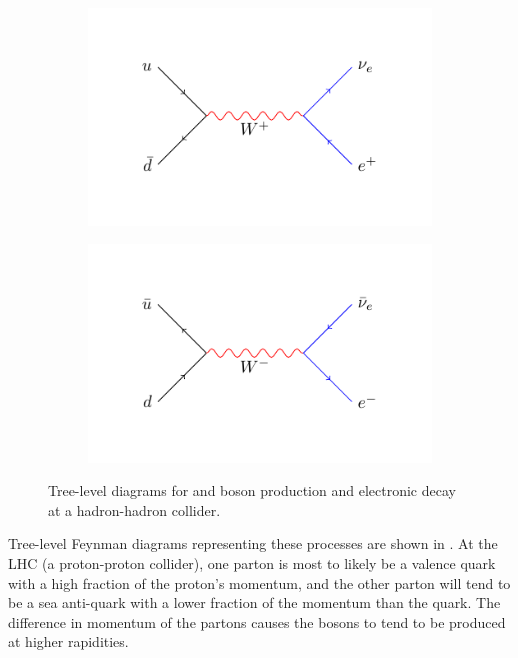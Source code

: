 \begin{figure}[htbp]
  \centering
  \begin{subfigure}{0.45\textwidth}
    \centering
    \includegraphics[width=\textwidth]{w_process_wp}
    \caption{\HepProcess{\Pup + \APdown \to \PWp \to \Pleptonplus \Pnulepton}}
    \label{fig:w_process_wp}
  \end{subfigure}
  \begin{subfigure}{0.45\textwidth}
    \centering
    \includegraphics[width=\textwidth]{w_process_wm}
    \caption{\HepProcess{\APup + \Pdown \to \PWm \to \Pleptonminus \APnulepton}}
    \label{fig:w_process_wm}
  \end{subfigure}
  \caption{Tree-level diagrams for \PWp and \PWm boson production and electronic
decay at a hadron-hadron collider.}\label{fig:w_process} 
\end{figure}

Tree-level Feynman diagrams representing these processes are shown in
.
At the {LHC} (a proton-proton collider), one parton is most to likely be a
valence quark with a high fraction of the proton's momentum, and the other
parton will tend to be a sea anti-quark with a lower fraction of the momentum
than the quark. The difference in momentum of the partons causes the \PW bosons 
to tend to be produced at higher rapidities. 

